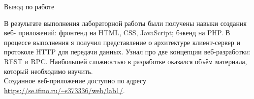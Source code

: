 \documentclass[12pt]{article}
\begin{document}
\newpage

\Large\textcolor{NavyBlue}{Вывод по работе}\\

\rmfamily\small
\vspace{5mm}
\raggedright
В результате выполнения лабораторной работы были получены навыки создания веб-
приложений: фронтенд на HTML, CSS, JavaScript; бэкенд на PHP. В процессе выполнения я
получил представление о архитектуре клиент-сервер и протоколе HTTP для передачи данных.
Узнал про две концепции веб-разработки: REST и RPC. Наибольшей сложностью в разработке
оказался объём материала, который необходимо изучить.\\
\vspace{5mm}
Созданное веб-приложение доступно по адресу \url{https://se.ifmo.ru/~s373336/web/lab1/}.
\end{document}
